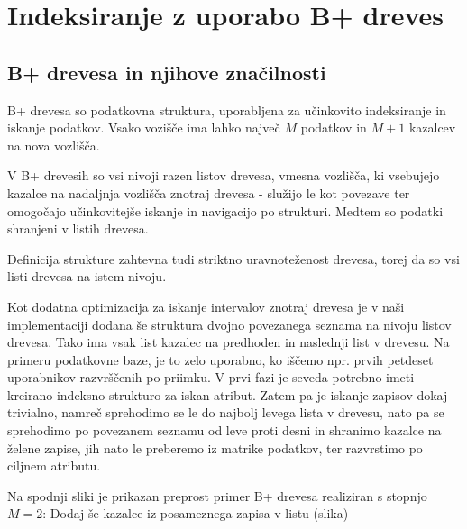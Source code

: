 \documentclass[a4paper,12pt,openright]{book}
\begin{document}
    \newpage
    \section{Indeksiranje z uporabo B+ dreves}
        \subsection{B+ drevesa in njihove značilnosti}

        B+ drevesa so podatkovna struktura, uporabljena za učinkovito indeksiranje in iskanje podatkov.
        Vsako vozišče ima lahko največ $M$ podatkov in $M+1$ kazalcev na nova vozlišča.

        V B+ drevesih so vsi nivoji razen listov drevesa, vmesna vozlišča, ki vsebujejo kazalce na nadaljnja vozlišča znotraj drevesa - služijo le kot povezave ter omogočajo učinkovitejše iskanje in navigacijo po strukturi. Medtem so podatki shranjeni v listih drevesa.

        Definicija strukture zahtevna tudi striktno uravnoteženost drevesa, torej da so vsi listi drevesa na istem nivoju.

        Kot dodatna optimizacija za iskanje intervalov znotraj drevesa je v naši implementaciji dodana še struktura dvojno povezanega seznama na nivoju listov drevesa. Tako ima vsak list kazalec na predhoden in naslednji list v drevesu. Na primeru podatkovne baze, je to zelo uporabno, ko iščemo npr. prvih petdeset uporabnikov razvrščenih po priimku. V prvi fazi je seveda potrebno imeti kreirano indeksno strukturo za iskan atribut. Zatem pa je iskanje zapisov dokaj trivialno, namreč sprehodimo se le do najbolj levega lista v drevesu, nato pa se sprehodimo po povezanem seznamu od leve proti desni in shranimo kazalce na želene zapise, jih nato le preberemo iz matrike podatkov, ter razvrstimo po ciljnem atributu.

        Na spodnji sliki je prikazan preprost primer B+ drevesa realiziran s stopnjo $M=2$:
        \colorbox{BurntOrange}{Dodaj še kazalce iz posameznega zapisa v listu (slika)}
        
\end{document}

